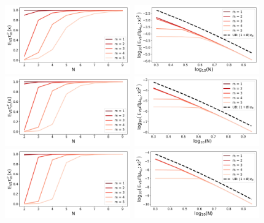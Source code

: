 \documentclass[twoside,11pt]{book}
\numberwithin{theorem}{chapter}
\numberwithin{definition}{chapter}
\numberwithin{proposition}{chapter}
\numberwithin{corollary}{chapter}
\numberwithin{example}{chapter}
\numberwithin{lemma}{chapter}
\numberwithin{assumption}{chapter}
\numberwithin{equation}{chapter}
\numberwithin{figure}{chapter}
\begin{document}
\begin{figure}[!]
\includegraphics[width= 0.48\textwidth]{img/icml/app/EX_VS_tau_n_s_3_d_1.pdf}~\includegraphics[width= 0.48\textwidth]{img/icml/app/EX_VS_err_n_s_3_d_1_new.pdf}\\
\includegraphics[width= 0.48\textwidth]{img/icml/app/EX_VS_tau_n_s_4_d_1.pdf}~\includegraphics[width= 0.48\textwidth]{img/icml/app/EX_VS_err_n_s_4_d_1_new.pdf}\\
\includegraphics[width= 0.48\textwidth]{img/icml/app/EX_VS_tau_n_s_5_d_1.pdf}~\includegraphics[width= 0.48\textwidth]{img/icml/app/EX_VS_err_n_s_5_d_1_new.pdf}\\

\end{figure}
\end{document}
